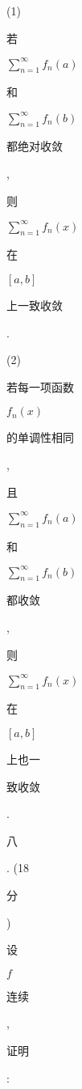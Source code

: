 \documentclass[10pt]{article}
\begin{document}
(1) \begin{CJK}{UTF8}{mj}若\end{CJK} $\sum_{n=1}^{\infty} f_{n}(a)$ \begin{CJK}{UTF8}{mj}和\end{CJK} $\sum_{n=1}^{\infty} f_{n}(b)$ \begin{CJK}{UTF8}{mj}都绝对收敛\end{CJK}, \begin{CJK}{UTF8}{mj}则\end{CJK} $\sum_{n=1}^{\infty} f_{n}(x)$ \begin{CJK}{UTF8}{mj}在\end{CJK} $[a, b]$ \begin{CJK}{UTF8}{mj}上一致收敛\end{CJK}.

(2) \begin{CJK}{UTF8}{mj}若每一项函数\end{CJK} $f_{n}(x)$ \begin{CJK}{UTF8}{mj}的单调性相同\end{CJK}, \begin{CJK}{UTF8}{mj}且\end{CJK} $\sum_{n=1}^{\infty} f_{n}(a)$ \begin{CJK}{UTF8}{mj}和\end{CJK} $\sum_{n=1}^{\infty} f_{n}(b)$ \begin{CJK}{UTF8}{mj}都收敛\end{CJK}, \begin{CJK}{UTF8}{mj}则\end{CJK} $\sum_{n=1}^{\infty} f_{n}(x)$ \begin{CJK}{UTF8}{mj}在\end{CJK} $[a, b]$ \begin{CJK}{UTF8}{mj}上也一\end{CJK} \begin{CJK}{UTF8}{mj}致收敛\end{CJK}.

\begin{CJK}{UTF8}{mj}八\end{CJK}. (18 \begin{CJK}{UTF8}{mj}分\end{CJK}) \begin{CJK}{UTF8}{mj}设\end{CJK} $f$ \begin{CJK}{UTF8}{mj}连续\end{CJK}, \begin{CJK}{UTF8}{mj}证明\end{CJK}:
\end{document}
